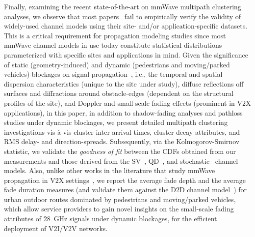 \documentclass[10pt, twocolumn]{IEEEtran}
\begin{document}
Finally, examining the recent state-of-the-art on mmWave multipath clustering analyses, we observe that most papers~\cite{Outdoor28G, PDAPs, D2DHumanBlockage, DopplerHST, V2XBlockages, MacCartneyUrbanHumanBlockage} fail to empirically verify the validity of widely-used channel models using their site- and/or application-specific datasets. This is a critical requirement for propagation modeling studies since most mmWave channel models in use today constitute statistical distributions parameterized with specific sites and applications in mind. Given the significance of static (geometry-induced) and dynamic (pedestrians and moving/parked vehicles) blockages on signal propagation~\cite{Rappaport}, i.e., the temporal and spatial dispersion characteristics (unique to the site under study), diffuse reflections off surfaces and diffractions around obstacle-edges (dependent on the structural profiles of the site), and Doppler and small-scale fading effects (prominent in V$2$X applications), in this paper, in addition to shadow-fading analyses and pathloss studies under dynamic blockages, we present detailed multipath clustering investigations vis-\`{a}-vis cluster inter-arrival times, cluster decay attributes, and RMS delay- and direction-spreads. Subsequently, via the Kolmogorov-Smirnov statistic, we validate the \emph{goodness of fit} between the CDFs obtained from our measurements and those derived from the SV~\cite{SV_Molisch}, QD~\cite{QDC_NIST}, and stochastic~\cite{Indoor60G} channel models. Also, unlike other works in the literature that study mmWave propagation in V$2$X settings~\cite{DopplerHST, V2XBlockages, MacCartneyUrbanHumanBlockage}, we report the average fade depth and the average fade duration measures (and validate them against the D$2$D channel model~\cite{D2DHumanBlockage}) for urban outdoor routes dominated by pedestrians and moving/parked vehicles, which allow service providers to gain novel insights on the small-scale fading attributes of \SI{28}{\giga\hertz} signals under dynamic blockages, for the efficient deployment of V$2$I/V$2$V networks.
\end{document}

